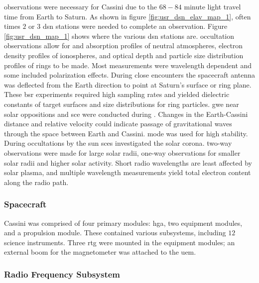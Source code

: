 \documentclass{article}
\theoremstyle{mystyle}
\begin{document}
\noindent observations were necessary for Cassini due to the $68-84$ minute light travel time from Earth to Saturn. As shown in figure \ref{fig:usr_dsn_elav_map_1}, often times $2$ or $3$ \gls{dsn} stations were needed to complete an observation. Figure \ref{fig:usr_dsn_map_1} shows where the various \gls{dsn} stations are. \Gls{occultation} observations allow for  and \glspl{absorption profile} of \glspl{neutral atmosphere}, \glspl{electron density profile} of \glspl{ionosphere}, and \gls{optical depth} and \gls{particle size distribution} profiles of rings to be made. Most measurements were wavelength dependent and some included \gls{polarization} effects. During close encounters the spacecraft antenna was deflected from the Earth direction to point at Saturn's surface or ring plane. These  \gls{bsr} experiments required high \glspl{sampling rate} and yielded dielectric constants of target surfaces and size distributions for ring particles. \gls{gwe} near \glspl{solar opposition} and \gls{sce} were conducted during . Changes in the Earth-Cassini distance and \gls{relative velocity} could indicate passage of gravitational waves through the space between Earth and Cassini.  mode was used for high stability. During \glspl{occultation} by the sun \glspl{sce} investigated the \gls{solar corona}. \Glspl{two-way observation} were made for large solar radii, \glspl{one-way observation} for smaller solar radii and higher solar activity. Short radio \glspl{wavelength} are least affected by \gls{solar plasma}, and multiple \gls{wavelength} measurements yield total \gls{electron} content along the \gls{radio path}. 



\subsubsection{Spacecraft \label{subsubsec:usr_spacecraft}}

Cassini was comprised of four primary modules: \gls{hga}, two equipment modules, and a propulsion module. These contained various subsystems, including $12$ science instruments. Three \gls{rtg} were mounted in the equipment modules; an external boom for the magnetometer was attached to the \gls{uem}. \hspace*{\fill}

\subsubsection{\footnotesize Radio Frequency Subsystem \label{subsubsec:usr_rad_freq_subsys}}
\end{document}

